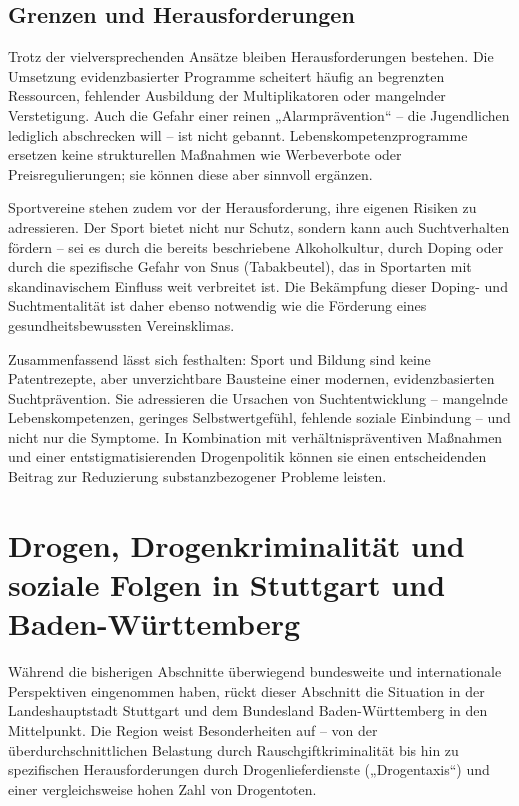 \documentclass[11pt,a4paper]{article}
\begin{document}
	\subsection{Grenzen und Herausforderungen}
	
	Trotz der vielversprechenden Ansätze bleiben Herausforderungen bestehen. Die Umsetzung evidenzbasierter Programme scheitert häufig an begrenzten Ressourcen, fehlender Ausbildung der Multiplikatoren oder mangelnder Verstetigung. Auch die Gefahr einer reinen „Alarmprävention“ – die Jugendlichen lediglich abschrecken will – ist nicht gebannt. Lebenskompetenzprogramme ersetzen keine strukturellen Maßnahmen wie Werbeverbote oder Preisregulierungen; sie können diese aber sinnvoll ergänzen\cite{life-skills-evaluation}.
	
	Sportvereine stehen zudem vor der Herausforderung, ihre eigenen Risiken zu adressieren. Der Sport bietet nicht nur Schutz, sondern kann auch Suchtverhalten fördern – sei es durch die bereits beschriebene Alkoholkultur, durch Doping oder durch die spezifische Gefahr von Snus (Tabakbeutel), das in Sportarten mit skandinavischem Einfluss weit verbreitet ist\cite{sport-prevention-risks}. Die Bekämpfung dieser Doping- und Suchtmentalität ist daher ebenso notwendig wie die Förderung eines gesundheitsbewussten Vereinsklimas.
	
	Zusammenfassend lässt sich festhalten: Sport und Bildung sind keine Patentrezepte, aber unverzichtbare Bausteine einer modernen, evidenzbasierten Suchtprävention. Sie adressieren die Ursachen von Suchtentwicklung – mangelnde Lebenskompetenzen, geringes Selbstwertgefühl, fehlende soziale Einbindung – und nicht nur die Symptome. In Kombination mit verhältnispräventiven Maßnahmen und einer entstigmatisierenden Drogenpolitik können sie einen entscheidenden Beitrag zur Reduzierung substanzbezogener Probleme leisten.
	
	\section{Drogen, Drogenkriminalität und soziale Folgen in Stuttgart und Baden-Württemberg}
	
	Während die bisherigen Abschnitte überwiegend bundesweite und internationale Perspektiven eingenommen haben, rückt dieser Abschnitt die Situation in der Landeshauptstadt Stuttgart und dem Bundesland Baden-Württemberg in den Mittelpunkt. Die Region weist Besonderheiten auf – von der überdurchschnittlichen Belastung durch Rauschgiftkriminalität bis hin zu spezifischen Herausforderungen durch Drogenlieferdienste („Drogentaxis“) und einer vergleichsweise hohen Zahl von Drogentoten.
	
\end{document}

